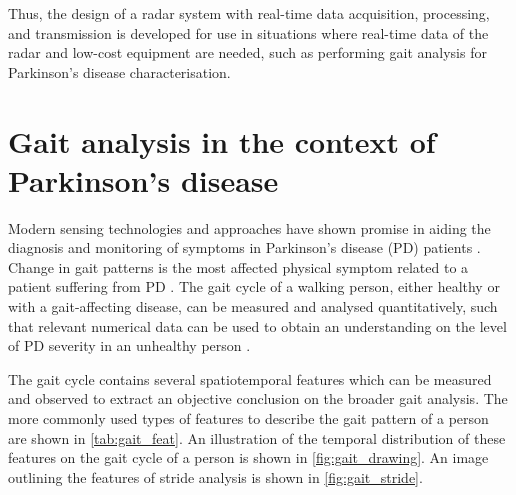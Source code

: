 	Thus, the design of a radar system with real-time data acquisition, processing, and transmission is developed for use in situations where real-time data of the radar and low-cost equipment are needed, such as performing gait analysis for Parkinson's disease characterisation.

	\section{Gait analysis in the context of Parkinson's disease} \label{sec:gait_analysis}

	Modern sensing technologies and approaches have shown promise in aiding the diagnosis and monitoring of symptoms in Parkinson's disease (PD) patients \cite{Biase2020}. Change in gait patterns is the most affected physical symptom related to a patient suffering from PD \cite{Zanardi2021}. The gait cycle of a walking person, either healthy or with a gait-affecting disease, can be measured and analysed quantitatively, such that relevant numerical data can be used to obtain an understanding on the level of PD severity in an unhealthy person \cite{Zanardi2021}.

	The gait cycle contains several spatiotemporal features which can be measured and observed to extract an objective conclusion on the broader gait analysis. The more commonly used types of features to describe the gait pattern of a person are shown in \cref{tab:gait_feat}. An illustration of the temporal distribution of these features on the gait cycle of a person is shown in \cref{fig:gait_drawing}. An image outlining the features of stride analysis is shown in \cref{fig:gait_stride}.

